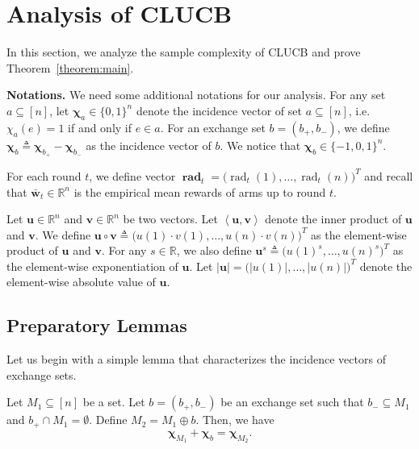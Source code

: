 \documentclass{article}
\newcommand{\Algorithm}{{\small \textsf{CLUCB}}\xspace}
\newcommand{\RR}{\mathbb R}
\DeclareMathOperator{\rad}{rad}
\newcommand{\inn}[1]{\left\langle #1 \right\rangle}
\renewcommand{\vec}[1]{\boldsymbol{#1}}
\renewcommand{\odot}{\circ}
\begin{document}
\maketitle


\section{Analysis of \Algorithm}

In this section, we analyze the sample complexity of \Algorithm and prove Theorem~\ref{theorem:main}.

\textbf{Notations.} 
We need some additional notations for our analysis.
For any set $a\subseteq [n]$, let $\vec \chi_a \in \{0,1\}^n$ denote the incidence vector of set $a \subseteq [n]$, i.e. $\chi_a(e) = 1$ if and only if $e\in a$.
For an exchange set $b=(b_+,b_-)$, we define $\vec \chi_b \triangleq \vec \chi_{b_+}- \vec \chi_{b_-}$ as the incidence vector of $b$.
We notice that $\vec \chi_b \in \{-1,0,1\}^n$.

For each round $t$, we define vector $\vec\rad_t = \big(\rad_t(1),\ldots,\rad_t(n)\big)^T$ and recall that $\vec {\bar w}_t\in \RR^n$ is the empirical mean rewards of arms up to round $t$.

Let $\vec u\in \RR^n$ and $\vec v\in \RR^n$ be two vectors.
Let $\inn{\vec u, \vec v}$ denote the inner product of $\vec u$ and $\vec v$.
We define $\vec u \odot \vec v \triangleq \big(u(1)\cdot v(1),\ldots,u(n)\cdot v(n)\big)^T$ as the element-wise product of $\vec u$ and $\vec v$.
For any $s\in \RR$, we also define $\vec u^s \triangleq \big(u(1)^s, \ldots, u(n)^s)^T$ as the element-wise exponentiation of $\vec u$.
Let $|\vec u| = \big(|u(1)|, \ldots, |u(n)|\big)^T$ denote the element-wise absolute value of $\vec u$.



\subsection{Preparatory Lemmas}
Let us begin with a simple lemma that characterizes the incidence vectors of exchange sets.
\begin{lemma}
Let $M_1 \subseteq [n]$ be a set.
Let $b=(b_+,b_-)$ be an exchange set such that 
$b_-\subseteq M_1$ and $b_+ \cap M_1 = \emptyset$.
Define $M_2 = M_1 \oplus b$.
Then, we have 
$$
\vec\chi_{M_1} +\vec\chi_{b} = \vec\chi_{M_2}.
$$
\label{lemma:exchange-char}
\end{lemma}
\end{document}
